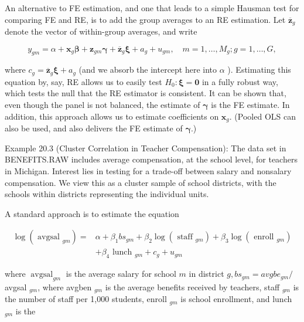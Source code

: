 \documentclass[10pt]{article}
\begin{document}
An alternative to FE estimation, and one that leads to a simple Hausman test for comparing FE and RE, is to add the group averages to an RE estimation. Let $\overline{\mathbf{z}}_{g}$ denote the vector of within-group averages, and write


\begin{equation*}
y_{g m}=\alpha+\mathbf{x}_{g} \boldsymbol{\beta}+\mathbf{z}_{g m} \boldsymbol{\gamma}+\overline{\mathbf{z}}_{g} \boldsymbol{\xi}+a_{g}+u_{g m}, \quad m=1, \ldots, M_{g} ; g=1, \ldots, G, \tag{20.32}
\end{equation*}


where $c_{g}=\overline{\mathbf{z}}_{g} \boldsymbol{\xi}+a_{g}$ (and we absorb the intercept here into $\alpha$ ). Estimating this equation by, say, RE allows us to easily test $H_{0}: \boldsymbol{\xi}=\mathbf{0}$ in a fully robust way, which tests the null that the RE estimator is consistent. It can be shown that, even though the panel is not balanced, the estimate of $\boldsymbol{\gamma}$ is the FE estimate. In addition, this approach allows us to estimate coefficients on $\mathbf{x}_{g}$. (Pooled OLS can also be used, and also delivers the FE estimate of $\boldsymbol{\gamma}$.)

Example 20.3 (Cluster Correlation in Teacher Compensation): The data set in BENEFITS.RAW includes average compensation, at the school level, for teachers in Michigan. Interest lies in testing for a trade-off between salary and nonsalary compensation. We view this as a cluster sample of school districts, with the schools within districts representing the individual units.

A standard approach is to estimate the equation


\begin{align*}
\log \left(\text { avgsal }_{g m}\right)= & \alpha+\beta_{1} b s_{g m}+\beta_{2} \log \left(\text { staff }_{g m}\right)+\beta_{3} \log \left(\text { enroll }_{g m}\right) \\
& +\beta_{4} \text { lunch }_{g m}+c_{g}+u_{g m} \tag{20.33}
\end{align*}


where $\operatorname{avgsal}_{g m}$ is the average salary for school $m$ in district $g, b s_{g m}=a v g b e_{g m} /$ avgsal $_{g m}$, where avgben $_{g m}$ is the average benefits received by teachers, staff ${ }_{g m}$ is the number of staff per 1,000 students, enroll ${ }_{g m}$ is school enrollment, and lunch $_{g m}$ is the
\end{document}
